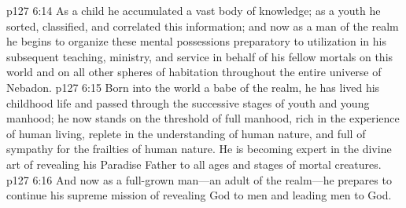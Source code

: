 \vs p127 6:14 As a child he accumulated a vast body of knowledge; as a youth he sorted, classified, and correlated this information; and now as a man of the realm he begins to organize these mental possessions preparatory to utilization in his subsequent teaching, ministry, and service in behalf of his fellow mortals on this world and on all other spheres of habitation throughout the entire universe of Nebadon.
\vs p127 6:15 Born into the world a babe of the realm, he has lived his childhood life and passed through the successive stages of youth and young manhood; he now stands on the threshold of full manhood, rich in the experience of human living, replete in the understanding of human nature, and full of sympathy for the frailties of human nature. He is becoming expert in the divine art of revealing his Paradise Father to all ages and stages of mortal creatures.
\vs p127 6:16 And now as a full\hyp{}grown man---an adult of the realm---he prepares to continue his supreme mission of revealing God to men and leading men to God.
